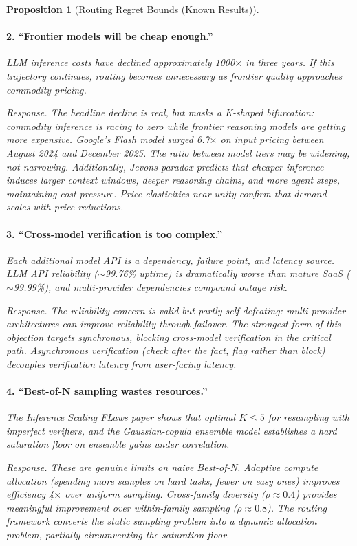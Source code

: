 \documentclass[11pt, a4paper, copyright]{googledeepmind}
\newtheorem{proposition}{Proposition}[section]
\begin{document}
\begin{proposition}[Routing Regret Bounds (Known Results)]
\paragraph{2. ``Frontier models will be cheap enough.''} LLM inference costs have declined approximately 1000$\times$ in three years. If this trajectory continues, routing becomes unnecessary as frontier quality approaches commodity pricing.

\emph{Response.} The headline decline is real, but masks a K-shaped bifurcation: commodity inference is racing to zero while frontier reasoning models are getting \emph{more} expensive. Google's Flash model surged 6.7$\times$ on input pricing between August 2024 and December 2025. The ratio between model tiers may be widening, not narrowing. Additionally, Jevons paradox predicts that cheaper inference induces larger context windows, deeper reasoning chains, and more agent steps, maintaining cost pressure. Price elasticities near unity confirm that demand scales with price reductions.

\paragraph{3. ``Cross-model verification is too complex.''} Each additional model API is a dependency, failure point, and latency source. LLM API reliability ($\sim$99.76\% uptime) is dramatically worse than mature SaaS ($\sim$99.99\%), and multi-provider dependencies compound outage risk.

\emph{Response.} The reliability concern is valid but partly self-defeating: multi-provider architectures can improve reliability through failover. The strongest form of this objection targets synchronous, blocking cross-model verification in the critical path. Asynchronous verification (check after the fact, flag rather than block) decouples verification latency from user-facing latency.

\paragraph{4. ``Best-of-N sampling wastes resources.''} The Inference Scaling FLaws paper \citep{inferencescalingflaws2024} shows that optimal $K \leq 5$ for resampling with imperfect verifiers, and the Gaussian-copula ensemble model \citep{correlatedensemble2026} establishes a hard saturation floor on ensemble gains under correlation.

\emph{Response.} These are genuine limits on \emph{naive} Best-of-N. Adaptive compute allocation (spending more samples on hard tasks, fewer on easy ones) improves efficiency 4$\times$ over uniform sampling. Cross-family diversity ($\rho \approx 0.4$) provides meaningful improvement over within-family sampling ($\rho \approx 0.8$). The routing framework converts the static sampling problem into a dynamic allocation problem, partially circumventing the saturation floor.


\end{proposition}
\end{document}
